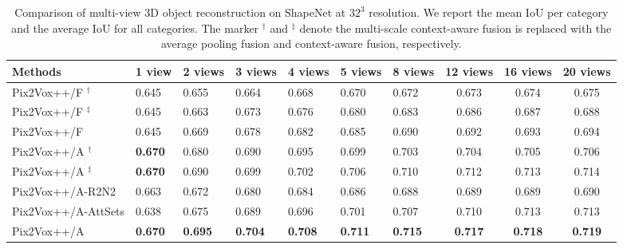 \documentclass[twocolumn]{svjour3}
\begin{document}
\begin{table*}[!t]
  \caption{Comparison of multi-view 3D object reconstruction on ShapeNet at $32^3$ resolution. We report the mean IoU per category and the average IoU for all categories. The marker $^\dag$ and $^\ddag$ denote the multi-scale context-aware fusion is replaced with the average pooling fusion and context-aware fusion, respectively.}
  \centering
  \begin{tabularx}{\linewidth}{lYYYYYYccc}
    \toprule
    
    Methods     & 1 view         & 2 views        & 3 views
                & 4 views        & 5 views        & 8 views
                & 12 views       & 16 views       & 20 views \\
    \midrule
    Pix2Vox++/F \hspace{.7mm}$^\dag$
                & 0.645          & 0.655          & 0.664
                & 0.668          & 0.670          & 0.672 
                & 0.673          & 0.674          & 0.675 \\
    Pix2Vox++/F \hspace{.7mm}$^\ddag$
                & 0.645          & 0.663          & 0.673
                & 0.676          & 0.680          & 0.683 
                & 0.686          & 0.687          & 0.688 \\
    Pix2Vox++/F  & 0.645         & 0.669          & 0.678
                & 0.682          & 0.685          & 0.690
                & 0.692          & 0.693          & 0.694 \\
    \midrule
    \midrule
    Pix2Vox++/A \hspace{.1mm}$^\dag$
                & \bf{0.670}     & 0.680          & 0.690
                & 0.695          & 0.699          & 0.703
                & 0.704          & 0.705          & 0.706 \\
    Pix2Vox++/A \hspace{.1mm}$^\ddag$
                & \bf{0.670}     & 0.690          & 0.699
                & 0.702          & 0.706          & 0.710
                & 0.712          & 0.713          & 0.714 \\
    Pix2Vox++/A-R2N2
                & 0.663          & 0.672          & 0.680
                & 0.684          & 0.686          & 0.688
                & 0.689          & 0.689          & 0.690 \\
    Pix2Vox++/A-AttSets
                & 0.638          & 0.675          & 0.689
                & 0.696          & 0.701          & 0.707
                & 0.710          & 0.713          & 0.713 \\
    \midrule
    Pix2Vox++/A & \bf{0.670}     & \bf{0.695}     & \bf{0.704}
                & \bf{0.708}     & \bf{0.711}     & \bf{0.715}
                & \bf{0.717}     & \bf{0.718}     & \bf{0.719} \\
    \bottomrule
  \end{tabularx}
  \label{tab:shapenet-context-aware-fusion}
\end{table*}
\end{document}
